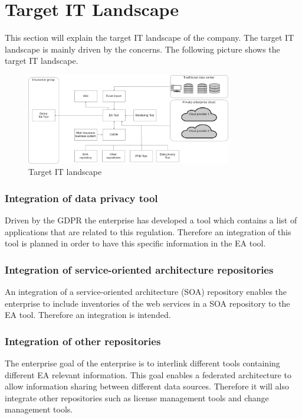 \section{Target IT Landscape}\label{section:targetitlandscape}

This section will explain the target IT landscape of the company. The target IT landscape is mainly driven by the concerns. The following picture shows the target IT landscape.

\begin{figure}[htpb]
  \centering
  \includegraphics[width=0.8\textwidth]{figures/target-it-landscape.png}
  \caption{ Target IT landscape~\parencite{Corpancho Villasana 2018}}
  \label{fig:Target IT landscape}
\end{figure}

\subsubsection{Integration of data privacy tool}
Driven by the GDPR the enterprise has developed a tool which contains a list of applications that are related to this regulation. Therefore an integration of this tool is planned in order to have this specific information in the EA tool.

\subsubsection{Integration of service-oriented architecture repositories}

An integration of a service-oriented architecture (SOA) repository enables the enterprise to include inventories of the web services in a SOA repository to the EA tool. Therefore an integration is intended.

\subsubsection{Integration of other repositories}
The enterprise goal of the enterprise is to interlink different tools containing different EA relevant information. This goal enables a federated architecture to allow information sharing between different data sources. Therefore it will also integrate other repositories such as license management tools and change management tools.

